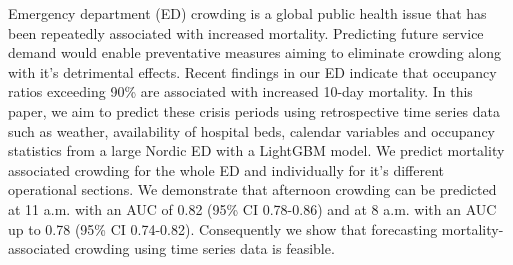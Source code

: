 Emergency department (ED) crowding is a global public health issue that has been repeatedly associated with increased mortality. Predicting future service demand would enable preventative measures aiming to eliminate crowding along with it's detrimental effects. Recent findings in our ED indicate that occupancy ratios exceeding 90\% are associated with increased 10-day mortality. In this paper, we aim to predict these crisis periods using retrospective time series data such as weather, availability of hospital beds, calendar variables and occupancy statistics from a large Nordic ED with a LightGBM model. We predict mortality associated crowding for the whole ED and individually for it's different operational sections. We demonstrate that afternoon crowding can be predicted at 11 a.m. with an AUC of 0.82 (95\% CI 0.78-0.86) and at 8 a.m. with an AUC up to 0.78 (95\% CI 0.74-0.82). Consequently we show that forecasting mortality-associated crowding using time series data is feasible.